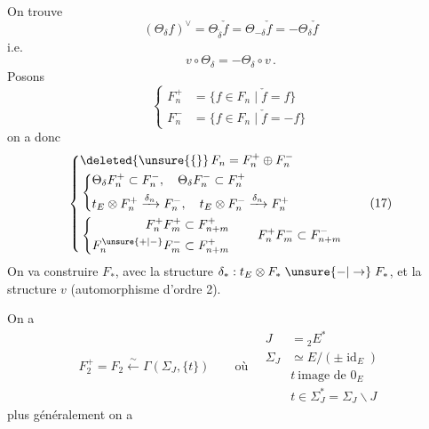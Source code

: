 On trouve
\[
 (\Theta_\delta f)^\vee=\Theta_{\check{\delta}}\check f
 =\Theta_{-\delta}\check f=-\Theta_\delta\check f \tag*{(15)}
\]
i.e.
\[
 v\circ\Theta_\delta=-\Theta_\delta\circ v\,.
\]
Posons
\[
 \left\{\begin{aligned}
 F_n^+&=\{f\in F_n\mid\check f=f\}\\
 F_n^-&=\{f\in F_n\mid\check f=-f\}
 \end{aligned}\right. \tag*{(16)}
\]
on a donc
\[
 \left\{\begin{aligned}
 &\deleted{\unsure{\{}}\,F_n=F_n^+\oplus F_n^-\\
 &\left\{\begin{aligned}
 &\Theta_\delta F_n^+\subset F_n^-,\quad \Theta_\delta F_n^-\subset F_n^+\\
 &t_E\otimes F_n^+\xrightarrow{\delta_n}F_n^-,\quad t_E\otimes F_n^-\xrightarrow{\delta_n}F_n^+
 \end{aligned}\right.\\
 &\left\{\begin{aligned}
 F_n^+F_m^+&\subset F_{n+m}^+\\
 F_n^{\unsure{+|-}}F_m^-&\subset F_{n+m}^+
 \end{aligned}\right.\qquad F_n^+F_m^-\subset F_{n+m}^-
 \end{aligned}\right. \tag*{(17)}
\]
On va construire  $F_*$, avec la structure $\delta_*:t_E\otimes F_*\mathrel{\unsure{-|\to}}F_*$,  et la structure $v$ (automorphisme d'ordre 2).

On a
\[
 F_2^+=F_2\xleftarrow{\sim}\Gamma(\Sigma_{J},\{t\})
 \qquad\text{où}\quad
 \begin{aligned}
 J&={}_2E^*\\
 \Sigma_J&\simeq E/(\pm\operatorname{id}_E)\\
 &t\ \text{image de }0_E\\
 &t\in\Sigma_J^*=\Sigma_J\smallsetminus J
 \end{aligned} \tag*{(18)}
\]
plus généralement on a
